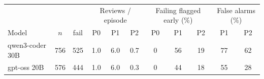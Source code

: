 \begin{tabular}{lcccccccccc}
\toprule
 & & & \multicolumn{3}{c}{Reviews / episode} & \multicolumn{3}{c}{Failing flagged early (\%)} & \multicolumn{2}{c}{False alarms (\%)} \\
Model & $n$ & fail & P0 & P1 & P2 & P0 & P1 & P2 & P1 & P2 \\
\midrule
qwen3-coder 30B & 756 & 525 & 1.0 & 6.0 & 0.7 & 0 & 56 & 19 & 77 & 62 \\
gpt-oss 20B & 576 & 444 & 1.0 & 6.0 & 0.3 & 0 & 44 & 18 & 55 & 28 \\
\bottomrule
\end{tabular}

